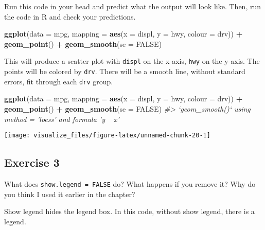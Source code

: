 \documentclass[]{book}
\newenvironment{Shaded}{\begin{snugshade}}{\end{snugshade}}
\newcommand{\CommentTok}[1]{\textcolor[rgb]{0.56,0.35,0.01}{\textit{#1}}}
\newcommand{\DataTypeTok}[1]{\textcolor[rgb]{0.13,0.29,0.53}{#1}}
\newcommand{\KeywordTok}[1]{\textcolor[rgb]{0.13,0.29,0.53}{\textbf{#1}}}
\newcommand{\NormalTok}[1]{#1}
\newcommand{\OperatorTok}[1]{\textcolor[rgb]{0.81,0.36,0.00}{\textbf{#1}}}
\newcommand{\OtherTok}[1]{\textcolor[rgb]{0.56,0.35,0.01}{#1}}
\newcommand{\StringTok}[1]{\textcolor[rgb]{0.31,0.60,0.02}{#1}}
\theoremstyle{plain}
\theoremstyle{remark}
\theoremstyle{definition}
\theoremstyle{definition}
\theoremstyle{definition}
\theoremstyle{remark}
\begin{document}
Run this code in your head and predict what the output will look like.
Then, run the code in R and check your predictions.

\begin{Shaded}
\begin{Highlighting}[]
\KeywordTok{ggplot}\NormalTok{(}\DataTypeTok{data =}\NormalTok{ mpg, }\DataTypeTok{mapping =} \KeywordTok{aes}\NormalTok{(}\DataTypeTok{x =}\NormalTok{ displ, }\DataTypeTok{y =}\NormalTok{ hwy, }\DataTypeTok{colour =}\NormalTok{ drv)) }\OperatorTok{+}
\StringTok{  }\KeywordTok{geom_point}\NormalTok{() }\OperatorTok{+}
\StringTok{  }\KeywordTok{geom_smooth}\NormalTok{(}\DataTypeTok{se =} \OtherTok{FALSE}\NormalTok{)}
\end{Highlighting}
\end{Shaded}

This will produce a scatter plot with \texttt{displ} on the x-axis,
\texttt{hwy} on the y-axis. The points will be colored by \texttt{drv}.
There will be a smooth line, without standard errors, fit through each
\texttt{drv} group.

\begin{Shaded}
\begin{Highlighting}[]
\KeywordTok{ggplot}\NormalTok{(}\DataTypeTok{data =}\NormalTok{ mpg, }\DataTypeTok{mapping =} \KeywordTok{aes}\NormalTok{(}\DataTypeTok{x =}\NormalTok{ displ, }\DataTypeTok{y =}\NormalTok{ hwy, }\DataTypeTok{colour =}\NormalTok{ drv)) }\OperatorTok{+}
\StringTok{  }\KeywordTok{geom_point}\NormalTok{() }\OperatorTok{+}
\StringTok{  }\KeywordTok{geom_smooth}\NormalTok{(}\DataTypeTok{se =} \OtherTok{FALSE}\NormalTok{)}
\CommentTok{#> `geom_smooth()` using method = 'loess' and formula 'y ~ x'}
\end{Highlighting}
\end{Shaded}

\begin{center}\texttt{[image: visualize\_files/figure-latex/unnamed-chunk-20-1]} \end{center}

\hypertarget{exercise-3-2}{%
\subsection{Exercise 3}\label{exercise-3-2}}

What does \texttt{show.legend\ =\ FALSE} do? What happens if you remove
it? Why do you think I used it earlier in the chapter?

Show legend hides the legend box. In this code, without show legend,
there is a legend.
\end{document}
